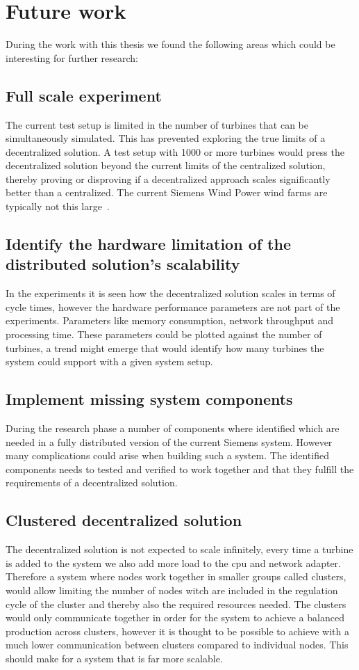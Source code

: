 \chapter{Future work}
\label{sec:futWork}
During the work with this thesis we found the following areas which could be interesting for further research:

\section{Full scale experiment}
The current test setup is limited in the number of turbines that can be simultaneously simulated. This has prevented exploring the true limits of a decentralized solution.
A test setup with 1000 or more turbines would press the decentralized solution beyond the current limits of the centralized solution, thereby proving or disproving if a decentralized approach scales significantly better than a centralized. The current Siemens Wind Power wind farms are typically not this large~\cite{simensOnShoreProjects,simensOffShoreProjects}.


\section{Identify the hardware limitation of the distributed solution's scalability}
In the experiments it is seen how the decentralized solution scales in terms of cycle times, however the hardware performance parameters are not part of the experiments.
Parameters like memory consumption, network throughput and processing time. These parameters could be plotted against the number of turbines, a trend might emerge that would identify how many turbines the system could support with a given system setup.


\section{Implement missing system components}
During the research phase a number of components where identified which are needed in a fully distributed version of the current Siemens system.
However many complications could arise when building such a system. The identified components needs to tested and verified to work together and that they fulfill the requirements of a decentralized solution. 


\section{Clustered decentralized solution}
The decentralized solution is not expected to scale infinitely, every time a turbine is added to the system we also add more load to the cpu and network adapter.
Therefore a system where nodes work together in smaller groups called clusters, would allow limiting the number of nodes witch are included in the regulation cycle of the cluster and thereby also the required resources needed. 
The clusters would only communicate together in order for the system to achieve a balanced production across clusters, however it is thought to be possible to achieve with a much lower communication between clusters compared to individual nodes.
This should make for a system that is far more scalable.


